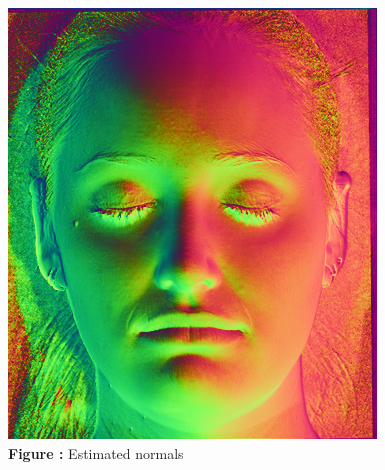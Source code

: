 \documentclass{article}
\begin{document}
	\begin{minipage}{0.48\linewidth}
	\centering
	\includegraphics[width=\linewidth]{./src/1f-b.png}
	 \\ %
	\textbf{Figure \thefigure:} Estimated normals  %
	\label{fig:Q1_fb}         %
	\end{minipage}	
\newline	
\newline
\end{document}
